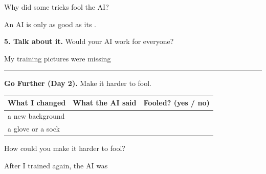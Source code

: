 \documentclass[11pt]{article}
\begin{document}
\vspace{0.8em}
Why did some tricks fool the AI? 

\vspace{0.9em}
An AI is only as good as its .


\vspace{1.1em}
{\large\textbf{5. Talk about it.}} Would your AI work for everyone?

\vspace{0.6em}
My training pictures were missing 

\vspace{0.9em}
\blank{6.9in}

\vspace{1.2em}
\hrule
\vspace{0.8em}
{\large\textbf{Go Further (Day 2).}} Make it harder to fool.

\vspace{0.3em}
\begin{tabular}{|R{2.3in}|R{1.8in}|c|}
\hline
\textbf{What I changed} & \textbf{What the AI said} & \textbf{Fooled? (yes / no)} \\ \hline
a new background &  & \\[0.4em] \hline
a glove or a sock & & \\[0.4em] \hline
\end{tabular}

\vspace{0.7em}
How could you make it harder to fool? 

\vspace{0.7em}
After I trained again, the AI was 
\end{document}
